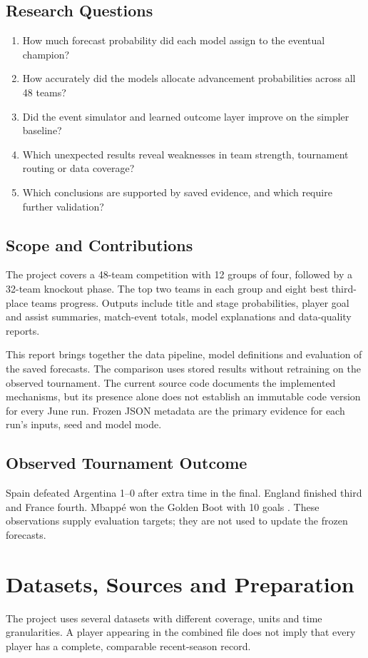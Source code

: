 \subsection{Research Questions}
\begin{enumerate}
\item How much forecast probability did each model assign to the eventual champion?
\item How accurately did the models allocate advancement probabilities across all 48 teams?
\item Did the event simulator and learned outcome layer improve on the simpler baseline?
\item Which unexpected results reveal weaknesses in team strength, tournament routing or data coverage?
\item Which conclusions are supported by saved evidence, and which require further validation?
\end{enumerate}
\subsection{Scope and Contributions}
The project covers a 48-team competition with 12 groups of four, followed by
a 32-team knockout phase. The top two teams in each group and eight best
third-place teams progress. Outputs include title and stage probabilities,
player goal and assist summaries, match-event totals, model explanations and
data-quality reports.

This report brings together the data pipeline, model definitions and evaluation
of the saved forecasts. The comparison uses stored results without retraining
on the observed tournament. The current source code documents the implemented
mechanisms, but its presence alone does not establish an immutable code version
for every June run. Frozen JSON metadata are the primary evidence for each
run's inputs, seed and model mode.
\subsection{Observed Tournament Outcome}
Spain defeated Argentina 1--0 after extra time in the final. England finished
third and France fourth. Mbapp\'{e} won the Golden Boot with 10 goals
\cite{outcome-final,outcome-standings,outcome-awards}. These observations supply
evaluation targets; they are not used to update the frozen forecasts.
\clearpage

\section{Datasets, Sources and Preparation}
\label{sec:data}
The project uses several datasets with different coverage, units and time
granularities. A player appearing in the combined file does not imply that
every player has a complete, comparable recent-season record.
